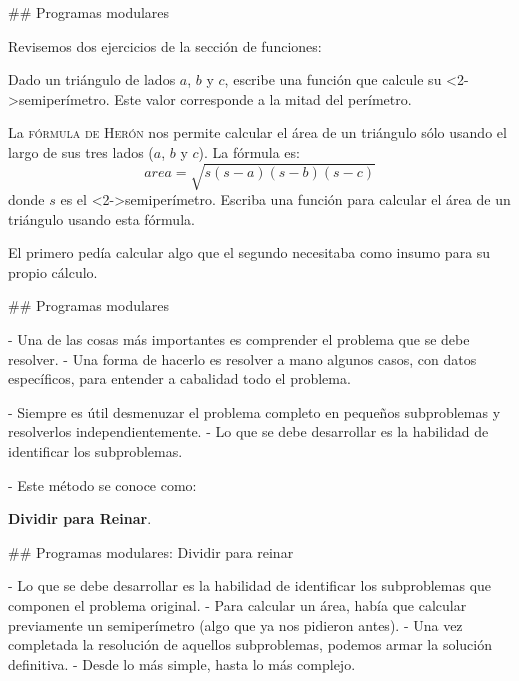 ## Programas modulares

Revisemos dos ejercicios de la sección de funciones:


\bgnblocknormal
\flushleft{}\vspace{-2ex} Dado un triángulo de lados $a$, $b$ y $c$, escribe una función que calcule su \alert{<2->}{semiperímetro}. Este
valor corresponde a la mitad del perímetro.
\trmblocknormal

\bgnblocknormal
\flushleft{}\vspace{-2ex} La \textsc{fórmula de Herón} nos permite calcular el área de un triángulo sólo usando
el largo de sus tres lados ($a$, $b$ y $c$).
La fórmula es: $$ area = \sqrt{s (s-a) (s-b) (s-c)} $$ donde $s$ es el \alert{<2->}{semiperímetro}.
Escriba una función para calcular el área de un triángulo usando esta fórmula.
\trmblocknormal

\pause

\bgnblockdanger
El primero pedía calcular algo que el segundo necesitaba como insumo para su propio cálculo.
\trmblockdanger


## Programas modulares


- Una de las cosas más importantes es comprender el problema que se debe resolver.
    - Una forma de hacerlo es resolver a mano algunos casos, con datos específicos, para entender a cabalidad todo el problema.

\pause

- Siempre es útil desmenuzar el problema completo en pequeños subproblemas y resolverlos independientemente. 
    - Lo que se debe desarrollar es la habilidad de identificar los subproblemas.

\pause

- Este método se conoce como:

\bgnblockdefinition
\centering  \textbf{Dividir para Reinar}.
\trmblockdefinition

## Programas modulares: Dividir para reinar

- Lo que se debe desarrollar es la habilidad de identificar los subproblemas  que componen el problema original.
    - Para calcular un área, había que calcular previamente un semiperímetro (algo que ya nos pidieron antes).
- Una vez completada la resolución de aquellos subproblemas, podemos armar la solución definitiva.
    - Desde lo más simple, hasta lo más complejo.

